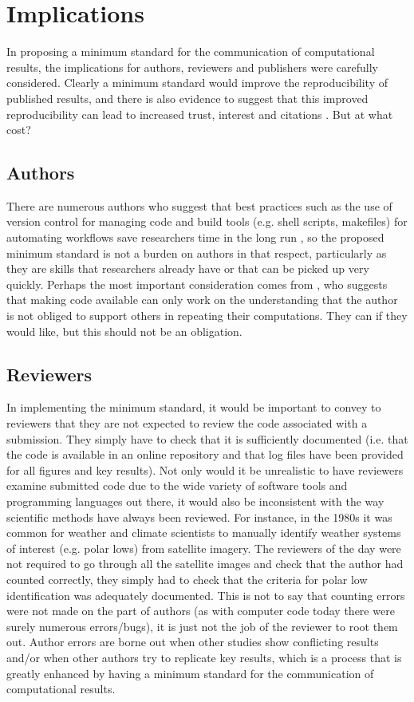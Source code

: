 \section{Implications}

In proposing a minimum standard for the communication of computational results, the implications for authors, reviewers and publishers were carefully considered. Clearly a minimum standard would improve the reproducibility of published results, and there is also evidence to suggest that this improved reproducibility can lead to increased trust, interest and citations \citep{Piwowar2007}. But at what cost?

\subsection{Authors}

There are numerous authors who suggest that best practices such as the use of version control for managing code and build tools (e.g. shell scripts, makefiles) for automating workflows save researchers time in the long run \citep[e.g.][]{Sandve2013,Wilson2014a}, so the proposed minimum standard is not a burden on authors in that respect, particularly as they are skills that researchers already have or that can be picked up very quickly. Perhaps the most important consideration comes from \citet{Easterbrook2014}, who suggests that making code available can only work on the understanding that the author is not obliged to support others in repeating their computations. They can if they would like, but this should not be an obligation.

\subsection{Reviewers}

In implementing the minimum standard, it would be important to convey to reviewers that they are not expected to review the code associated with a submission. They simply have to check that it is sufficiently documented (i.e. that the code is available in an online repository and that log files have been provided for all figures and key results). Not only would it be unrealistic to have reviewers examine submitted code due to the wide variety of software tools and programming languages out there, it would also be inconsistent with the way scientific methods have always been reviewed. For instance, in the 1980s it was common for weather and climate scientists to manually identify weather systems of interest (e.g. polar lows) from satellite imagery. The reviewers of the day were not required to go through all the satellite images and check that the author had counted correctly, they simply had to check that the criteria for polar low identification was adequately documented. This is not to say that counting errors were not made on the part of authors (as with computer code today there were surely numerous errors/bugs), it is just not the job of the reviewer to root them out. Author errors are borne out when other studies show conflicting results and/or when other authors try to replicate key results, which is a process that is greatly enhanced by having a minimum standard for the communication of computational results.


